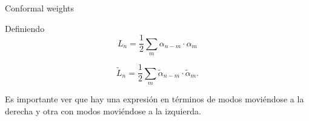 Conformal weights

Definiendo
\begin{equation}
  L_n=\frac 1 2 \sum_m \alpha_{n-m} \cdot \alpha_m
\end{equation}

\begin{equation}
  \tilde{L}_n=\frac 1 2 \sum_m \tilde{\alpha}_{n-m} \cdot \tilde{\alpha}_m.
\end{equation}

Es importante ver que hay una expresión en términos de modos moviéndose a la derecha
y otra con modos moviéndose a la izquierda.

